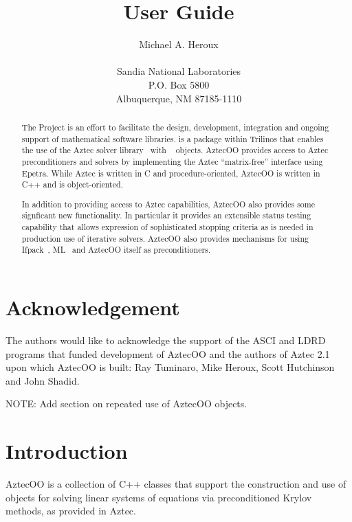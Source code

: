 \documentclass[12pt,relax]{AztecOOUserGuide}
\title{\AztecOOTM{} User Guide}
\author{Michael A. Heroux \\
	\\
	    Sandia National Laboratories\\
	    P.O. Box 5800\\
	    Albuquerque, NM 87185-1110 
	 }
\date{} %
\begin{document}
\maketitle

\begin{abstract}

The \TrilinosTM{} Project is an effort to facilitate the design, development,
integration and ongoing support of mathematical software libraries.
\AztecOOTM{} is a package within Trilinos that enables the use of the Aztec solver 
library~\cite{Aztec2.1} with \EpetraTM{}~\cite{Epetra-Users-Guide} objects.  
AztecOO provides access to Aztec preconditioners and solvers by
implementing the Aztec ``matrix-free'' interface using Epetra.
While Aztec is written in C and procedure-oriented, 
AztecOO is written in C++ and is object-oriented.

In addition to providing access to Aztec capabilities, AztecOO also
provides some signficant new functionality.  In particular it provides
an extensible status testing capability that allows expression of
sophisticated stopping criteria as is needed in production use of
iterative solvers.  AztecOO also provides mechanisms for using 
Ifpack~\cite{Ifpack-Ref-Guide}, ML~\cite{ML-home-page} and AztecOO
itself as preconditioners.
\end{abstract}


\section*{Acknowledgement}
The authors would like to acknowledge the support of the ASCI and LDRD 
programs that funded development of AztecOO and the authors of Aztec
2.1 upon which AztecOO is built: Ray Tuminaro, Mike Heroux, Scott
Hutchinson and John Shadid.  

\clearpage
\tableofcontents
\listoffigures
\listoftables

\clearpage


NOTE: Add section on repeated use of AztecOO objects.


\section{Introduction}
\label{Section:Introduction}

AztecOO is a collection of C++ classes that support the construction
and use of objects for solving linear systems of equations via
preconditioned Krylov methods, as provided in Aztec.
\end{document}

